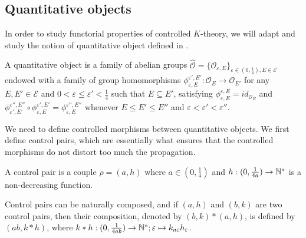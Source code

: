 
\subsection{Quantitative objects}

In order to study functorial properties of controlled $K$-theory, we will adapt and study the notion of quantitative object defined in \cite{OY2}.

\begin{definition}
A quantitative object is a family of abelian groups $\hat{\mathcal{O}}=\{\mathcal{O}_{\varepsilon, E}\}_{\varepsilon\in (0,\frac{1}{4}), E\in\mathcal{E}}$ endowed with a family of group homomorphisms $\phi_{\varepsilon, E}^{\varepsilon', E'} : \mathcal{O}_E\rightarrow \mathcal{O}_{E'}$ for any $E,E'\in\mathcal E$ and $0<\varepsilon\leq \varepsilon'<\frac{1}{4}$ such that $E\subseteq E'$, satisfying $\phi_{\varepsilon, E}^{\varepsilon, E}= id_{\mathcal{O}_E}$ and $\phi_{\varepsilon', E'}^{\varepsilon'', E''}\circ \phi_{\varepsilon, E}^{\varepsilon', E'} =\phi^{\varepsilon'', E''}_{\varepsilon, E}$ whenever $E\leq E' \leq E''$ and $\varepsilon<\varepsilon'<\varepsilon''$.
\end{definition}

We need to define controlled morphisms between quantitative objects. We first define control pairs, which are essentially what ensures that the controlled morphisms do not distort too much the propagation.\\

\begin{definition}
A control pair is a couple $\rho=(a,h)$ where $a\in (0,\frac{1}{4})$ and $h : (0,\frac{1}{4a})\rightarrow \mathbb N^*$ is a non-decreasing function. 
\end{definition}

Control pairs can be naturally composed, and if $(a,h)$ and $(b,k)$ are two control pairs, then their composition, denoted by $(b,k)\ast(a,h)$, is defined by $(ab,k\ast h)$, where $k\ast h : (0,\frac{1}{4ab})\rightarrow \mathbb N^* ; \varepsilon \mapsto k_{a \varepsilon}h_\varepsilon$. \\

